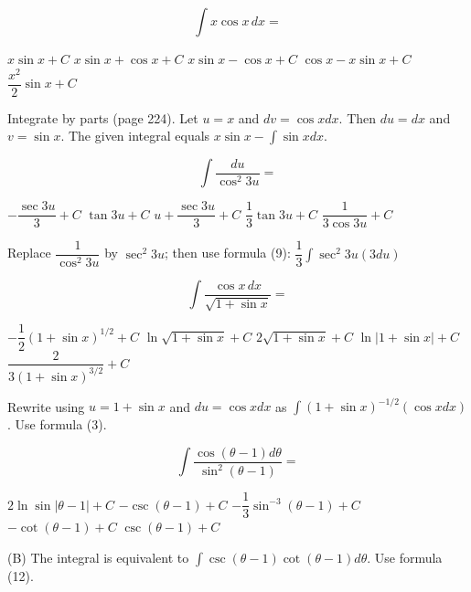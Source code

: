 \newpage


\question
\[
\displaystyle\int x \cos x \,dx=
\]
\begin{choices}
  \choice $x \sin x+C$
  \CorrectChoice $x \sin x+\cos x+C$
  \choice $x \sin x-\cos x+C$
  \choice $\cos x-x \sin x+C$
  \choice $\dfrac{x^{2}}{2} \sin x+C$
\end{choices}
\begin{solution}
Integrate by parts (page 224). Let $u=x$ and $d v=\cos x d x$. Then $d u=d x$ and $v=\sin x$. The given integral equals $x \sin x-\displaystyle\int \sin x d x$.
\end{solution}

\question
\[
\displaystyle\int \dfrac{d u}{\cos ^{2} 3 u}=
\]
\begin{choices}
  \choice $-\dfrac{\sec 3 u}{3}+C$
  \choice $\tan 3 u+C$
  \choice $u+\dfrac{\sec 3 u}{3}+C$
  \CorrectChoice $\dfrac{1}{3} \tan 3 u+C$
  \choice $\dfrac{1}{3 \cos 3 u}+C$
\end{choices}
\begin{solution}
Replace $\dfrac{1}{\cos ^{2} 3 u}$ by $\sec ^{2} 3 u$; then use formula (9): $\dfrac{1}{3} \displaystyle\int \sec ^{2} 3 u(3 d u)$
\end{solution}

\question
\[
\displaystyle\int \dfrac{\cos x \,dx}{\sqrt{1+\sin x}}=
\]
\begin{choices}
  \choice $-\dfrac{1}{2}(1+\sin x)^{1 / 2}+C$
  \choice $\ln \sqrt{1+\sin x}+C$
  \CorrectChoice $2 \sqrt{1+\sin x}+C$
  \choice $\ln |1+\sin x|+C$
  \choice $\dfrac{2}{3(1+\sin x)^{3 / 2}}+C$
\end{choices}
\begin{solution}
Rewrite using $u=1+\sin x$ and $d u=\cos x d x$ as $\displaystyle\int(1+\sin x)^{-1 / 2}(\cos x d x)$.
Use formula (3).
\end{solution}




\newpage


\question
\[
\displaystyle\int \dfrac{\cos (\theta-1) d \theta}{\sin ^{2}(\theta-1)}=
\]
\begin{choices}
  \choice $2 \ln \sin |\theta-1|+C$
  \CorrectChoice $-\csc (\theta-1)+C$
  \choice $-\dfrac{1}{3} \sin ^{-3}(\theta-1)+C$
  \choice $-\cot (\theta-1)+C$
  \choice $\csc (\theta-1)+C$
\end{choices}
\begin{solution}
(B) The integral is equivalent to $\displaystyle\int \csc (\theta-1) \cot (\theta-1) d \theta$. Use formula (12).
\end{solution}

